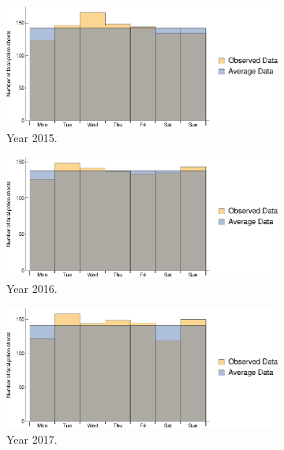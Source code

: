 \documentclass[conf]{new-aiaa}
\begin{document}
\begin{figure}[!htbp]
\centering
\begin{subfigure}{.49\textwidth}
  \centering
  \includegraphics[width=\linewidth]{q4/q4-day-2015.eps}  
  \caption{Year 2015.}
  \label{fig:q4-day-2015}
\end{subfigure}
\begin{subfigure}{.49\textwidth}
  \centering
  \includegraphics[width=\linewidth]{q4/q4-day-2016.eps}  
  \caption{Year 2016.}
  \label{fig:q4-day-2016}
\end{subfigure}
\begin{subfigure}{.49\textwidth}
  \centering
  \includegraphics[width=\linewidth]{q4/q4-day-2017.eps}  
  \caption{Year 2017.}
  \label{fig:q4-day-2017}
\end{subfigure}
\begin{subfigure}{.49\textwidth}

\end{subfigure}
\end{figure}
\end{document}
